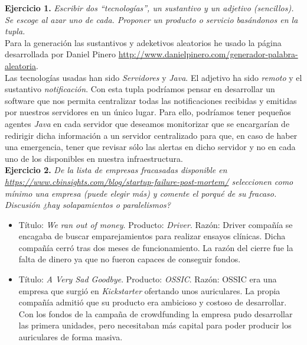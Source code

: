 \documentclass[12pt]{article}
\begin{document}
\textbf{Ejercicio 1.} \textit{Escribir dos ``tecnologías'', un sustantivo y un adjetivo (sencillos). Se escoge al azar uno de cada. Proponer un producto o servicio basándonos en la tupla.} \\

Para la generación las sustantivos y adeketivos aleatorios he usado la página desarrollada por Daniel Pinero \href{http://www.danielpinero.com/generador-palabra-aleatoria}{http://www.danielpinero.com/generador-palabra-aleatoria}. \\

Las tecnologías usadas han sido \textit{Servidores} y \textit{Java}. El adjetivo ha sido \textit{remoto} y el sustantivo \textit{notificación}. Con esta tupla podríamos pensar en desarrollar un software que nos permita centralizar todas las notificaciones recibidas y emitidas por nuestros servidores en un único lugar. Para ello, podríamos tener pequeños agentes \textit{Java} en cada servidor que deseamos monitorizar que se encargarían de redirigir dicha información a un servidor centralizado para que, en caso de haber una emergencia, tener que revisar sólo las alertas en dicho servidor y no en cada uno de los disponibles en nuestra infraestructura. \\

\textbf{Ejercicio 2.} \textit{De la lista de empresas fracasadas disponible en \href{https://www.cbinsights.com/blog/startup-failure-post-mortem/}{https://www.cbinsights.com/blog/startup-failure-post-mortem/}
seleccionen como mínimo una empresa (puede elegir más) y comente el porqué de su fracaso. Discusión ¿hay solapamientos o paralelismos?}

\begin{itemize}
	\item Título: \textit{We ran out of money}. Producto: \textit{Driver}. Razón: Driver compañía se encagaba de buscar emparejamientos para realizar ensayos clínicas. Dicha compañía cerró tras dos meses de funcionamiento. La razón del cierre fue la falta de dinero ya que no fueron capaces de conseguir fondos.
	
	\item Título: \textit{A Very Sad Goodbye}. Producto: \textit{OSSIC}. Razón: OSSIC era una empresa que surgió en \textit{Kickstarter} ofertando unos auriculares. La propia compañía admitió que su producto era ambicioso y costoso de desarrollar. Con los fondos de la campaña de crowdfunding la empresa pudo desarrollar las primera unidades, pero necesitaban más capital para poder producir los auriculares de forma masiva.
\end{itemize}
\end{document}
